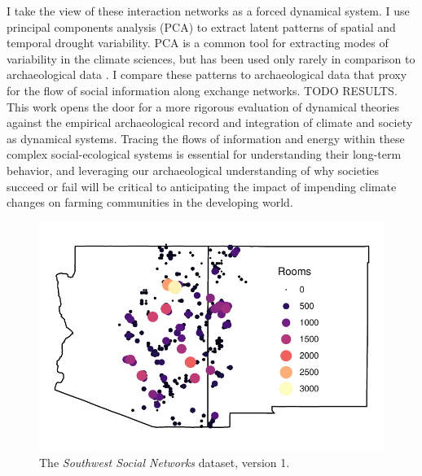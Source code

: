 \documentclass[10pt]{iopart}
\begin{document}
I take the view of these interaction networks as a forced dynamical system. I use principal components analysis (PCA) to extract latent patterns of spatial and temporal drought variability. PCA is a common tool for extracting modes of variability in the climate sciences, but has been used only rarely in comparison to archaeological data \parencite{Weiss1982, Cordell2007}. I compare these patterns to archaeological data that proxy for the flow of social information along exchange networks. TODO RESULTS. This work opens the door for a more rigorous evaluation of dynamical theories against the empirical archaeological record and integration of climate and society as dynamical systems. Tracing the flows of information and energy within these complex social-ecological systems is essential for understanding their long-term behavior, and leveraging our archaeological understanding of why societies succeed or fail will be critical to anticipating the impact of impending climate changes on farming communities in the developing world.


\begin{figure}[!ht]
\centering
\includegraphics[width=.9\linewidth]{figures/site_distribution.pdf}
\caption{The \emph{Southwest Social Networks} dataset, version 1.} 
\label{fig:network-plot}
\end{figure}
\end{document}
